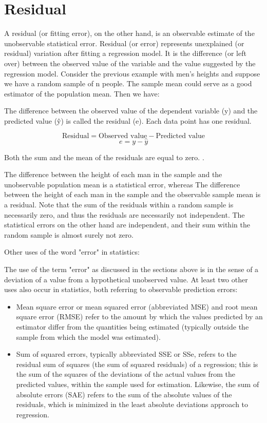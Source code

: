 \documentclass[12pt, a4paper]{report}
\theoremstyle{plain}
\theoremstyle{definition}
\theoremstyle{remark}
\begin{document}
	\section{Residual}
	
	A residual (or fitting error), on the other hand, is an observable estimate of the unobservable statistical error.
	Residual (or error) represents unexplained (or residual) variation after fitting a regression model. It is the difference (or left over) between the observed value of the variable and the value suggested by the regression model.
	Consider the previous example with men's heights and suppose we have a random sample of n people. The sample mean could serve as a good estimator of the population mean. Then we have:
	
	
	The difference between the observed value of the dependent variable (y) and the predicted value (ŷ) is called the residual (e). Each data point has one residual.
	
	\[ \mbox{Residual} = \mbox{Observed value} - \mbox{Predicted value}\]
	\[e = y - \hat{y} \]
	
	Both the sum and the mean of the residuals are equal to zero. .
	
	
	
	The difference between the height of each man in the sample and the unobservable population mean is a statistical error, whereas
	The difference between the height of each man in the sample and the observable sample mean is a residual.
	Note that the sum of the residuals within a random sample is necessarily zero, and thus the residuals are necessarily not independent. The statistical errors on the other hand are independent, and their sum within the random sample is almost surely not zero.
	
	
	Other uses of the word "error" in statistics: 
	
	The use of the term "error" as discussed in the sections above is in the sense of a deviation of a value from a hypothetical unobserved value. At least two other uses also occur in statistics, both referring to observable prediction errors:
	
	\begin{itemize}
		\item Mean square error or mean squared error (abbreviated MSE) and root mean square error (RMSE) refer to the amount by which the values predicted by an estimator differ from the quantities being estimated (typically outside the sample from which the model was estimated).
		
		\item 
		Sum of squared errors, typically abbreviated SSE or SSe, refers to the residual sum of squares (the sum of squared residuals) of a regression; this is the sum of the squares of the deviations of the actual values from the predicted values, within the sample used for estimation. Likewise, the sum of absolute errors (SAE) refers to the sum of the absolute values of the residuals, which is minimized in the least absolute deviations approach to regression.
		
	\end{itemize}
	
\end{document}
